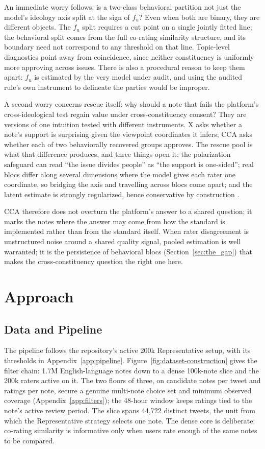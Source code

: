 \documentclass[10pt,twocolumn]{article}
\begin{document}
An immediate worry follows: is a two-class behavioral partition not just the
model's ideology axis split at the sign of $f_u$? Even when both are binary,
they are different objects. The $f_u$ split requires a cut point on a single
jointly fitted line; the behavioral split comes from the full co-rating
similarity structure, and its boundary need not correspond to any threshold on
that line. Topic-level diagnostics point away from coincidence, since neither
constituency is uniformly more approving across issues. There is also a
procedural reason to keep them apart: $f_u$ is estimated by the very model under
audit, and using the audited rule's own instrument to delineate the parties
would be improper.

A second worry concerns rescue itself: why should a note that fails the
platform's cross-ideological test regain value under cross-constituency
consent? They are versions of one intuition tested with different instruments.
X asks whether a note's support is surprising given the viewpoint coordinates it
infers; CCA asks whether each of two behaviorally recovered groups approves. The
rescue pool is what that difference produces, and three things open it: the
polarization safeguard can read ``the issue divides people'' as ``the support is
one-sided''; real blocs differ along several dimensions where the model gives
each rater one coordinate, so bridging the axis and travelling across blocs come
apart; and the latent estimate is strongly regularized, hence conservative by
construction \citep{goyal2026qsmf}.

CCA therefore does not overturn the platform's answer to a shared question; it
marks the notes where the answer may come from how the standard is implemented
rather than from the standard itself. When rater disagreement is unstructured
noise around a shared quality signal, pooled estimation is well warranted; it is
the persistence of behavioral blocs (Section~\ref{sec:the_gap}) that makes the
cross-constituency question the right one here.

\section{Approach}
\label{sec:approach}

\subsection{Data and Pipeline}
\label{sec:data-pipeline}

The pipeline follows the repository's active 200k Representative setup, with
its thresholds in Appendix~\ref{app:pipeline}.
Figure~\ref{fig:dataset-construction} gives the filter chain: 1.7M
English-language notes down to a dense 100k-note slice and the 200k raters
active on it. The two floors of three, on candidate notes per tweet and ratings
per note, secure a genuine multi-note choice set and minimum observed coverage
(Appendix~\ref{app:filters}); the 48-hour window keeps ratings tied to the
note's active review period. The slice spans 44,722 distinct tweets, the unit
from which the Representative strategy selects one note. The dense core is
deliberate: co-rating similarity is informative only when users rate enough of
the same notes to be compared.
\end{document}

